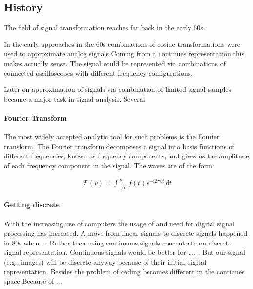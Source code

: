 

\subsection{History}
\label{sec:history}
The field of signal transformation reaches far back in the early 60s.
\cite{Rubinstein2010}

In the early approaches in the 60s combinations of cosine
transformations were used to approximate analog signals Coming from a continues
representation this makes actually sense. The signal could be represented via
combinations of connected oscilloscopes with different frequency
configurations. 

Later on approximation of signals via combination of limited signal samples
became a major task in signal analysis. Several 

\paragraph{Fourier Transform}

The most widely accepted analytic tool for such problems is the Fourier
transform. The Fourier transform decomposes a signal into basis functions of
different frequencies, known as frequency components, and gives us the amplitude
of each frequency component in the signal. The waves are of the form:

\begin{align*}
 \mathcal{F}\left(v\right) = \int_{-\infty}^{\infty} \! f(t)e^{-i2\pi vt} \,
\mathrm{d}t
\end{align*}






\paragraph{Getting discrete}

With the increasing use of computers the usage of and need for digital signal
processing has increased.
A move from linear signals to discrete signals happened in 80s when ... 
Rather then using continuous signals concentrate on discrete
signal representation. Continuous signals would be better for .... .  But our
signal (e.g., images) will be discrete anyway because of their initial digital
representation. Besides the problem of coding becomes different in the continues
space \cite{} Because of ...


